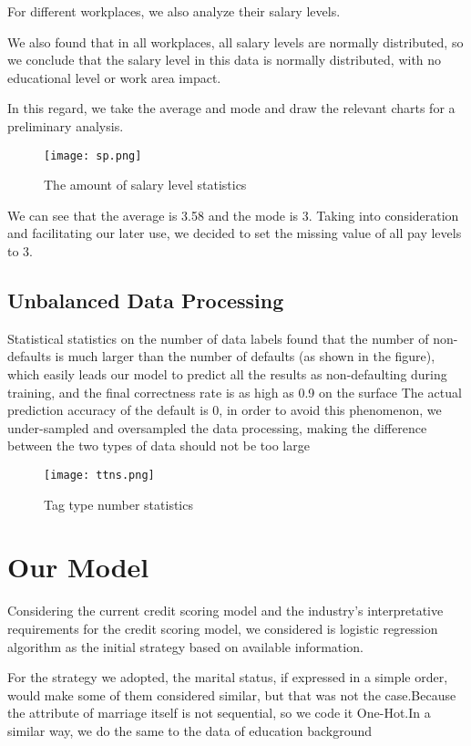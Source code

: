 \documentclass{mcmthesis}
\begin{document}
For different workplaces, we also analyze their salary levels.

We also found that in all workplaces, all salary levels are normally distributed, so we conclude that the salary level in this data is normally distributed, with no educational level or work area impact.

In this regard, we take the average and mode and draw the relevant charts for a preliminary analysis.

\begin{figure}[h]
\small
\centering
\texttt{[image: sp.png]}
\caption{The amount of salary level statistics} \label{fig:The amount of salary level statistics}
\end{figure}

We can see that the average is 3.58 and the mode is 3. Taking into consideration and facilitating our later use, we decided to set the missing value of all pay levels to 3.

\subsection{Unbalanced Data Processing}
Statistical statistics on the number of data labels found that the number of non-defaults is much larger than the number of defaults (as shown in the figure), which easily leads our model to predict all the results as non-defaulting during training, and the final correctness rate is as high as 0.9 on the surface The actual prediction accuracy of the default is 0, in order to avoid this phenomenon, we under-sampled and oversampled the data processing, making the difference between the two types of data should not be too large
\newline
\begin{figure}[h]
\small
\centering
\texttt{[image: ttns.png]}
\caption{Tag type number statistics} \label{fig:Tag type number statistics}
\end{figure}

\section{Our Model}
Considering the current credit scoring model and the industry's interpretative requirements for the credit scoring model, we considered is logistic regression algorithm as the initial strategy based on available information.

For the strategy we adopted, the marital status, if expressed in a simple order, would make some of them considered similar, but that was not the case.Because the attribute of marriage itself is not sequential, so we code it One-Hot.In a similar way, we do the same to the data of education background
\end{document}
